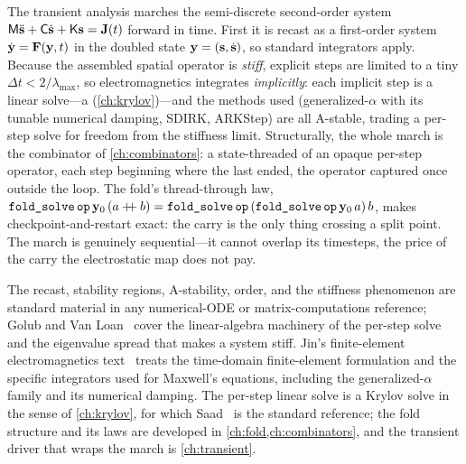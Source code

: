 \summarysection
The transient analysis marches the semi-discrete second-order system $\mathsf{M}\ddot{\mathbf{s}}
+ \mathsf{C}\dot{\mathbf{s}} + \mathsf{K}\mathbf{s} = \mathbf{J}(t)$ forward in time. First it is recast as a
first-order system $\dot{\mathbf{y}} = \mathbf{F}(\mathbf{y}, t)$ in the doubled state $\mathbf{y} = (\mathbf{s},
\dot{\mathbf{s}})$, so standard integrators apply. Because the assembled spatial operator is
\emph{stiff}, explicit steps are limited to a tiny $\Delta t < 2/\lambda_{\max}$,
so electromagnetics integrates \emph{implicitly}: each implicit step is a linear
solve---a  (\cref{ch:krylov})---and the methods used
(generalized-$\alpha$ with its tunable numerical damping, SDIRK, ARKStep) are all
A-stable, trading a per-step solve for freedom from the stiffness limit.
Structurally, the whole march is the  combinator of
\cref{ch:combinators}: a state-threaded  of an opaque per-step operator,
each step beginning where the last ended, the operator captured once outside the
loop. The fold's thread-through law,
$\texttt{fold\_solve}\,\texttt{op}\,\mathbf{y}_0\,(a\mathbin{+\!\!+}b) =
\texttt{fold\_solve}\,\texttt{op}\,(\texttt{fold\_solve}\,\texttt{op}\,\mathbf{y}_0\,a)\,b$, makes
checkpoint-and-restart exact: the carry is the only thing crossing a split point.
The march is genuinely sequential---it cannot overlap its timesteps, the price of
the carry the electrostatic map does not pay.

\furtherreading
The recast, stability regions, A-stability, order, and the stiffness phenomenon are
standard material in any numerical-ODE or matrix-computations
reference; Golub and Van Loan~\citep{golubvanloan2013} cover the linear-algebra
machinery of the per-step solve and the eigenvalue spread that makes a system
stiff. Jin's finite-element electromagnetics text~\citep{jin2014} treats the
time-domain finite-element formulation and the specific integrators used for
Maxwell's equations, including the generalized-$\alpha$ family and its numerical
damping. The per-step linear solve is a Krylov solve in the sense of
\cref{ch:krylov}, for which Saad~\citep{saad2003} is the standard reference; the
fold structure and its laws are developed in \cref{ch:fold,ch:combinators}, and the
transient driver that wraps the march is \cref{ch:transient}.

